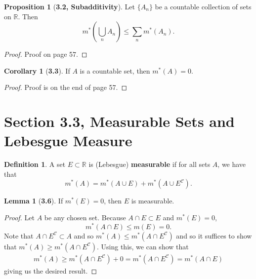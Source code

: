 \documentclass[12pt]{article}
\newcommand{\R}{\mathbb{R}}
\newcommand{\C}{\mathscr{C}}
\theoremstyle{definition}
\newtheorem*{definition}{Definition}
\newtheorem*{lemma}{Lemma}
\newtheorem*{cor}{Corollary}
\newtheorem*{prop}{Proposition}
\begin{document}
\begin{prop}[\textbf{3.2, Subadditivity}]

    Let \( \{ A_n \} \) be a countable collection of sets on \( \R \). Then 
        \[
            m^{*} \left( \bigcup_{n} A_n \right) \leq \sum_{n} m^{*}(A_n).  
        \]

    \begin{proof}
        Proof on page 57. 

    \end{proof}

    
\end{prop}

\begin{cor}[\textbf{3.3}]

    If \( A \) is a countable set, then \( m^{*}(A) = 0 \).

    \begin{proof}

        Proof is on the end of page 57. 

    \end{proof}
\end{cor}


\section*{Section 3.3, Measurable Sets and Lebesgue Measure}

\begin{definition}
    A set \( E \subset \R \) is (Lebesgue) \textbf{measurable} if for all sets \( A \), we have that
        \[
            m^{*}(A) = m^{*}(A \cup E) + m^{*}(A \cup E^{\C}).  
        \]
\end{definition}

\begin{lemma}[\textbf{3.6}]
    
    If \( m^{*}(E) = 0 \), then \( E \) is measurable. 

        \begin{proof}
            Let \( A \) be any chosen set. Because \( A \cap E \subset E \) and \( m^{*}(E) = 0 \),
                \[
                    m^{*}(A \cap E) \leq m(E) = 0.  
                \]
            Note that \( A \cap E^{\C} \subset A \) and so \( m^{*}(A) \leq m^{*}(A \cap E^{\C}) \) and so it suffices to show that
            \( m^{*}(A) \geq m^{*}(A \cap E^{\C}) \). Using this, we can show that
                \begin{align*}
                    m^{*}(A) \geq m^{*}(A \cap E^{\C}) + 0 = m^{*}(A \cap E^{\C}) = m^{*}(A \cap E)
                \end{align*}
            giving us the desired result.
        \end{proof}

\end{lemma}
\end{document}
